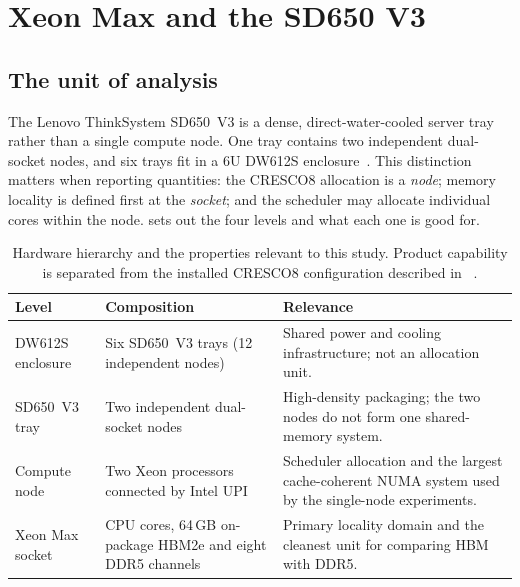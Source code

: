 
\section{Xeon Max and the SD650 V3}
\label{sec:xeon-max-platform}

\subsection{The unit of analysis}

The Lenovo ThinkSystem SD650~V3 is a dense, direct-water-cooled server
tray rather than a single compute node.  One tray contains two
independent dual-socket nodes, and six trays fit in a 6U DW612S
enclosure~\cite{lp1603}.  This distinction matters when reporting
quantities: the CRESCO8 allocation is a \emph{node}; memory locality is
defined first at the \emph{socket}; and the scheduler may allocate
individual cores within the node.   sets
out the four levels and what each one is good for.

\begin{table}[htbp]
\centering
\small
\tabsetup
\caption{Hardware hierarchy and the properties relevant to this study.
Product capability is separated from the installed CRESCO8
configuration described in 
~\cite{lp1603,cresco8doc}.}
\label{tab:hardware-hierarchy}
\begin{tabularx}{\textwidth}{@{}lYY@{}}
\toprule
\headrow
\textbf{Level} & \textbf{Composition} & \textbf{Relevance} \\
\midrule
DW612S enclosure
  & Six SD650~V3 trays (12 independent nodes)
  & Shared power and cooling infrastructure; not an allocation unit. \\
SD650~V3 tray
  & Two independent dual-socket nodes
  & High-density packaging; the two nodes do not form one shared-memory
    system. \\
Compute node
  & Two Xeon processors connected by Intel UPI
  & Scheduler allocation and the largest cache-coherent NUMA system used
    by the single-node experiments. \\
Xeon Max socket
  & CPU cores, 64\,GB on-package HBM2e and eight DDR5 channels
  & Primary locality domain and the cleanest unit for comparing HBM with
    DDR5. \\
\bottomrule
\end{tabularx}
\end{table}


